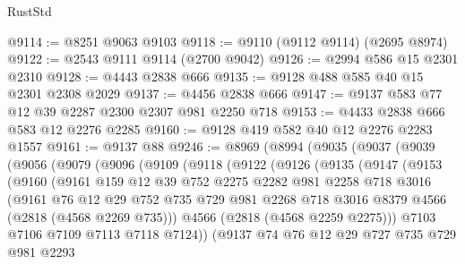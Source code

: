 \begin{lexlean}{RustStd}
\begin{coremodule}
@9114 := @8251 @9063 @9103
@9118 := @9110 (@9112 @9114) (@2695 @8974)
@9122 := @2543 @9111 @9114 (@2700 @9042)
@9126 := @2994 @586 @15 @2301 @2310
@9128 := @4443 @2838 @666
@9135 := @9128 @488 @585 @40 @15 @2301 @2308 @2029
@9137 := @4456 @2838 @666
@9147 := @9137 @583 @77 @12 @39 @2287 @2300 @2307 @981 @2250 @718
@9153 := @4433 @2838 @666 @583 @12 @2276 @2285
@9160 := @9128 @419 @582 @40 @12 @2276 @2283 @1557
@9161 := @9137 @88
@9246 := @8969
    (@8994
      (@9035
        (@9037
          (@9039
            (@9056
              (@9079
                (@9096
                  (@9109
                    (@9118
                      (@9122
                        (@9126
                          (@9135
                            (@9147
                              (@9153
                                (@9160
                                  (@9161
                                    @159
                                    @12
                                    @39
                                    @752
                                    @2275
                                    @2282
                                    @981
                                    @2258
                                    @718
                                    @3016
                                    (@9161
                                      @76
                                      @12
                                      @29
                                      @752
                                      @735
                                      @729
                                      @981
                                      @2268
                                      @718
                                      @3016
                                      @8379
                                      @4566
                                      (@2818 (@4568 @2269 @735)))
                                    @4566
                                    (@2818 (@4568 @2259 @2275)))
                                  @7103
                                  @7106
                                  @7109
                                  @7113
                                  @7118
                                  @7124))
                              (@9137
                                @74
                                @76
                                @12
                                @29
                                @727
                                @735
                                @729
                                @981
                                @2293

\end{coremodule}
\end{lexlean}
